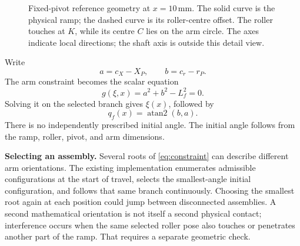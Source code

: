 \documentclass[11pt,letterpaper]{article}
\numberwithin{equation}{section}
\newcommand{\term}[1]{\par\needspace{4\baselineskip}\textbf{#1}\enspace}
\begin{document}
\begin{figure}[htbp]
\caption{Fixed-pivot reference geometry at $x=10\,\mathrm{mm}$. The solid curve is the physical ramp; the dashed curve is its roller-centre offset. The roller touches at $K$, while its centre $C$ lies on the arm circle. The axes indicate local directions; the shaft axis is outside this detail view.}
\label{fig:geometry}
\end{figure}

Write
\begin{equation}
  a=c_X-X_P,\qquad b=c_r-r_P.
\end{equation}
The arm constraint becomes the scalar equation
\begin{equation}
  \boxed{g(\xi,x)=a^2+b^2-L_f^2=0.}
  \label{eq:constraint}
\end{equation}
Solving it on the selected branch gives $\xi(x)$, followed by
\begin{equation}
  q_f(x)=\operatorname{atan2}(b,a).
  \label{eq:angle}
\end{equation}
There is no independently prescribed initial angle. The initial angle follows from the ramp, roller, pivot, and arm dimensions.

\term{Selecting an assembly.}
Several roots of \cref{eq:constraint} can describe different arm orientations. The existing implementation enumerates admissible configurations at the start of travel, selects the smallest-angle initial configuration, and follows that same branch continuously. Choosing the smallest root again at each position could jump between disconnected assemblies. A second mathematical orientation is not itself a second physical contact; interference occurs when the same selected roller pose also touches or penetrates another part of the ramp. That requires a separate geometric check.
\end{document}
